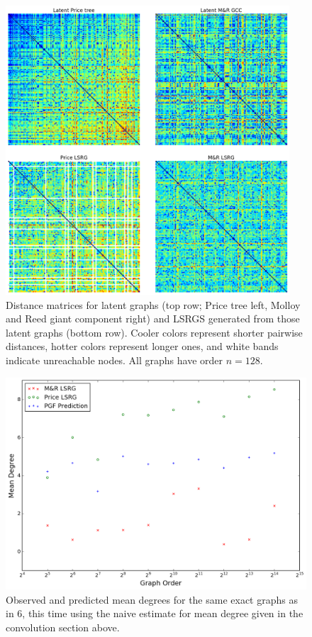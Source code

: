 \documentclass[12pt]{article}
\begin{document}
\begin{figure}[h!]
\begin{center}
\includegraphics[width=300pt]{6}
\caption{Distance matrices for latent graphs (top row; Price tree left, Molloy and Reed giant component
right) and LSRGS generated from those latent graphs (bottom row). Cooler colors represent shorter
pairwise distances, hotter colors represent longer ones, and white bands indicate unreachable nodes.
All graphs have order $n=128$.}
\end{center}
\end{figure}

\begin{figure}[h!]
\begin{center}
\includegraphics[width=350pt]{7}
\caption{Observed and predicted mean degrees for the same exact graphs as in 6, this time
using the naive estimate for mean degree given in the convolution section above.}
\end{center}
\end{figure}
\end{document}
